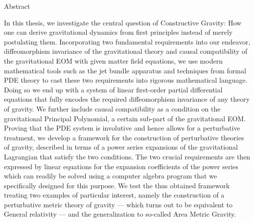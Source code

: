\documentclass[a4paper,12pt, DIV=14, BCOR=5mm, twoside, headsepline, numbers=noenddot]{scrbook}
\newenvironment{abstract}{%
  \titlepage%
  \null\vfil%
  \begin{center}\normalfont\usekomafont{disposition}Abstract\end{center}%
}{%
  \par
  \vfil\null%
  \endtitlepage%
}
\begin{document}
\begin{abstract}
In this thesis, we investigate the central question of Constructive Gravity: 
How one can derive gravitational dynamics from first principles instead of merely postulating them. 
Incorporating two fundamental requirements into our endeavor, diffeomorphism invariance of the gravitational theory and causal compatibility of the gravitational EOM with given matter field equations, we use modern mathematical tools such as the jet bundle apparatus and techniques from formal PDE theory to cast these two requirements into rigorous mathematical language. Doing so we end up with a system of linear first-order partial differential equations that fully encodes the required diffeomorphism invariance of any theory of gravity. We further include causal compatibility as a condition on the gravitational Principal Polynomial, a certain sub-part of the gravitational EOM. 
Proving that the PDE system is involutive and hence allows for a perturbative treatment, we develop a framework for the construction of perturbative theories of gravity, described in terms of a power series expansions of the gravitational Lagrangian that satisfy the two conditions. The two crucial requirements are then expressed by linear equations for the expansion coefficients of the power series which can readily be solved using a computer algebra program that we specifically designed for this purpose. We test the thus obtained framework treating two examples of particular interest, namely the construction of a perturbative metric theory of gravity --- which turns out to be equivalent to General relativity --- and the generalization to so-called Area Metric Gravity.
\end{abstract}
\end{document}
